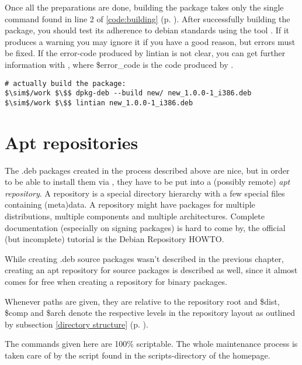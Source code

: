 Once all the preparations are done, building the package takes only the single
command found in line 2 of \lstlistingname{} \ref{code:building} (p.
\pageref{code:building}). After successfully building  the package, you should
test its adherence to debian standards using the tool . If it
produces a warning you may ignore it if you have a good reason, but errors must
be fixed. If the error-code produced by lintian is not clear, you can get
further information with , where 
\$error\_code is the code produced by .
\begin{lstlisting}[label=code:building,caption=create a package, float=ht]
# actually build the package:
$\sim$/work $\$$ dpkg-deb --build new/ new_1.0.0-1_i386.deb
$\sim$/work $\$$ lintian new_1.0.0-1_i386.deb
\end{lstlisting}


\section{Apt repositories}\label{chapter:apt repositories}
The .deb packages created in the process described above are nice, but in order
to be able to install them via , they have to be put into a
(possibly remote) \emph{apt repository}. A repository is a special directory hierarchy
with a few special files containing (meta)data. A repository might have packages
for multiple distributions, multiple components and  multiple architectures.
Complete documentation (especially on signing packages) is hard to come by, the 
official (but incomplete) tutorial is the Debian Repository
HOWTO\cite{debian repository howto}.

While creating .deb source packages wasn't described in the previous chapter,
creating an apt repository for source packages is described as well, since it
almost comes for free when creating a repository for binary packages.

Whenever paths are given, they are relative to the repository root and \$dist,
\$comp and \$arch denote the respective levels in the repository layout as
outlined by subsection \ref{directory structure} (p. \pageref{directory
structure}).

The commands given here are 100\% scriptable. The whole maintenance process is
taken care of by the script  found in the scripts-directory
of the \tunix homepage.

